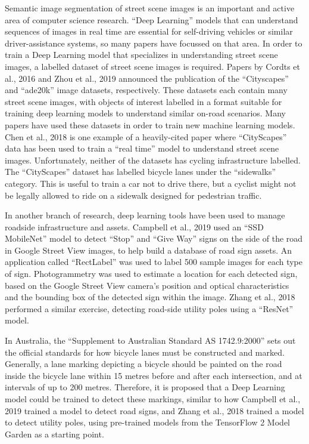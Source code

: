 \documentclass[11pt,twoside]{report}
\begin{document}
Semantic image segmentation of street scene images is an important and active area of computer science research.  ``Deep Learning'' models that can understand sequences of images in real time are essential for self-driving vehicles or similar driver-assistance systems, so many papers have focussed on that area.  In order to train a Deep Learning model that specializes in understanding street scene images, a labelled dataset of street scene images is required.  Papers by Cordts et al., 2016 \cite{Cordts_2016_CVPR} and Zhou et al., 2019 \cite{ade20k} announced the publication of the ``Cityscapes'' and ``ade20k'' image datasets, respectively.  These datasets each contain many street scene images, with objects of interest labelled in a format suitable for training deep learning models to understand similar on-road scenarios.  Many papers have used these datasets in order to train new machine learning models.  Chen et al., 2018 \cite{DEEPLAB} is one example of a heavily-cited paper where ``CityScapes'' data has been used to train a ``real time'' model to understand street scene images.  Unfortunately, neither of the datasets has cycling infrastructure labelled.  The ``CityScapes'' dataset has labelled bicycle lanes under the ``sidewalks'' category.  This is useful to train a car not to drive there, but a cyclist might not be legally allowed to ride on a sidewalk designed for pedestrian traffic.  

In another branch of research, deep learning tools have been used to manage roadside infrastructure and assets.  Campbell et al., 2019 \cite{CAMPBELL2019101350} used an ``SSD MobileNet'' model to detect ``Stop'' and ``Give Way'' signs on the side of the road in Google Street View images, to help build a database of road sign assets.  An application called ``RectLabel'' was used to label 500 sample images for each type of sign.  Photogrammetry was used to estimate a location for each detected sign, based on the Google Street View camera's position and optical characteristics and the bounding box of the detected sign within the image.  Zhang et al., 2018 \cite{s18082484} performed a similar exercise, detecting road-side utility poles using a ``ResNet'' model.

In Australia, the ``Supplement to Australian Standard AS 1742.9:2000'' sets out the official standards for how bicycle lanes must be constructed and marked.  Generally, a lane marking depicting a bicycle should be painted on the road inside the bicycle lane within 15 metres before and after each intersection, and at intervals of up to 200 metres\cite{standards}.  Therefore, it is proposed that a Deep Learning model could be trained to detect these markings, similar to how Campbell et al., 2019 \cite{CAMPBELL2019101350} trained a model to detect road signs, and Zhang et al., 2018 \cite{s18082484} trained a model to detect utility poles, using pre-trained models from the TensorFlow 2 Model Garden \cite{zoo} as a starting point.
\end{document}
